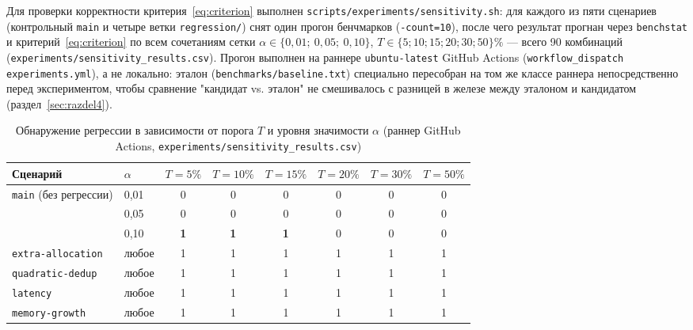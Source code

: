 Для проверки корректности критерия~\eqref{eq:criterion} выполнен
\texttt{scripts/\allowbreak experiments/\allowbreak sensitivity.sh}: для каждого из пяти сценариев
(контрольный \texttt{main} и четыре ветки \texttt{regression/\allowbreak *}) снят один
прогон бенчмарков (\texttt{-count=10}), после чего результат прогнан через
\texttt{benchstat} и критерий~\eqref{eq:criterion} по всем сочетаниям сетки
$\alpha \in \{0{,}01;\ 0{,}05;\ 0{,}10\}$, $T \in \{5;10;15;20;30;50\}\%$ —
всего 90 комбинаций (\texttt{experiments/\allowbreak sensitivity\_results.csv}).
Прогон выполнен на раннере \texttt{ubuntu-latest} GitHub Actions
(\texttt{workflow\_dispatch} \texttt{experiments.yml}), а не локально: эталон
(\texttt{benchmarks/\allowbreak baseline.txt}) специально пересобран на том же классе
раннера непосредственно перед экспериментом, чтобы сравнение "кандидат vs.
эталон" не смешивалось с разницей в железе между эталоном и кандидатом
(раздел~\ref{sec:razdel4}).

\begin{table}[htbp]
\caption{Обнаружение регрессии в зависимости от порога $T$ и уровня значимости $\alpha$ (раннер GitHub Actions, \texttt{experiments/sensitivity\_results.csv})}
\label{tab:5.2}
\centering
\begin{tabular}{llcccccc}
\toprule
Сценарий & $\alpha$ & $T{=}5\%$ & $T{=}10\%$ & $T{=}15\%$ & $T{=}20\%$ & $T{=}30\%$ & $T{=}50\%$ \\
\midrule
\multirow{3}{*}{\texttt{main} (без регрессии)}
 & 0,01 & 0 & 0 & 0 & 0 & 0 & 0 \\
 & 0,05 & 0 & 0 & 0 & 0 & 0 & 0 \\
 & 0,10 & \textbf{1} & \textbf{1} & \textbf{1} & 0 & 0 & 0 \\
\midrule
\texttt{extra-allocation} & любое & 1 & 1 & 1 & 1 & 1 & 1 \\
\texttt{quadratic-dedup} & любое & 1 & 1 & 1 & 1 & 1 & 1 \\
\texttt{latency} & любое & 1 & 1 & 1 & 1 & 1 & 1 \\
\texttt{memory-growth} & любое & 1 & 1 & 1 & 1 & 1 & 1 \\
\bottomrule
\end{tabular}
\end{table}

